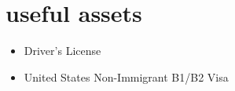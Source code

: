 \documentclass[]{friggeri-cv} %
\begin{document}

\section{useful assets}
\begin{itemize}
	\item Driver's License
	\item United States Non-Immigrant B1/B2 Visa
\end{itemize}









\end{document}
